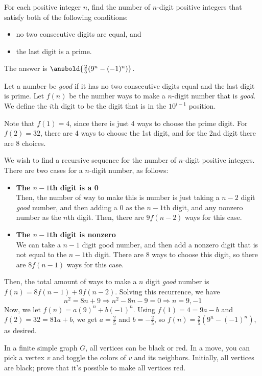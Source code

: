 \documentclass{article}
\begin{document}
\begin{exam}[JMO 2018/1]
For each positive integer $n$, find the number of $n$-digit positive integers that satisfy both of the following conditions:\begin{itemize}\item no two consecutive digits are equal, and\item the last digit is a prime.\end{itemize}
\end{exam}

\begin{sol}
The answer is $\ansbold{\frac{2}{5}(9^n-(-1)^n)}$.

Let a number be \textit{good} if it has no two consecutive digits equal and the last digit is prime. Let $f(n)$ be the number ways to make a $n$-digit number that is \textit{good}. We define the $i$th digit to be the digit that is in the $10^{i-1}$ position.

Note that $f(1)=4$, since there is just 4 ways to choose the prime digit. For $f(2)=32$, there are 4 ways to choose the 1st digit, and for the 2nd digit there are 8 choices.

We wish to find a recursive sequence for the number of $n$-digit positive integers. There are two cases for a $n$-digit number, as follows:
\begin{itemize}
    \item \textbf{The $n-1$th digit is a 0} \\
     Then, the number of way to make this is number is just taking a $n-2$ digit \textit{good} number, and then adding a 0 as the $n-1$th digit, and any nonzero number as the $n$th digit. Then, there are $9f(n-2)$ ways for this case.
    \item \textbf{The $n-1$th digit is nonzero} \\
    We can take a $n-1$ digit good number, and then add a nonzero digit that is not equal to the $n-1$th digit. There are 8 ways to choose this digit, so there are $8f(n-1)$ ways for this case.
\end{itemize}
Then, the total amount of ways to make a $n$ digit \textit{good} number is $f(n)=8f(n-1)+9f(n-2)$. Solving this recurrence, we have
\[n^2=8n+9 \Rightarrow n^2-8n-9=0 \Rightarrow n=9, -1\]
Now, we let $f(n)=a(9)^n+b(-1)^n$. Using $f(1)=4=9a-b$ and $f(2)=32=81a+b$, we get $a=\frac{2}{5}$ and $b=-\frac{2}{5}$, so $f(n)=\frac{2}{5}(9^n-(-1)^n)$, as desired.
\end{sol}

\begin{exam}
In a finite simple graph $G$, all vertices can be black or red. In a move, you can pick a vertex $v$ and toggle the colors of $v$ and its neighbors. Initially, all vertices are black; prove that it's possible to make all vertices red.
\end{exam}
\end{document}
